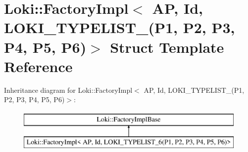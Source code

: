 \hypertarget{structLoki_1_1FactoryImpl_3_01AP_00_01Id_00_01LOKI__TYPELIST__6_07P1_00_01P2_00_01P3_00_01P4_00_01P5_00_01P6_08_4}{}\section{Loki\+:\+:Factory\+Impl$<$ A\+P, Id, L\+O\+K\+I\+\_\+\+T\+Y\+P\+E\+L\+I\+S\+T\+\_(P1, P2, P3, P4, P5, P6)$>$ Struct Template Reference}
\label{structLoki_1_1FactoryImpl_3_01AP_00_01Id_00_01LOKI__TYPELIST__6_07P1_00_01P2_00_01P3_00_01P4_00_01P5_00_01P6_08_4}
Inheritance diagram for Loki\+:\+:Factory\+Impl$<$ A\+P, Id, L\+O\+K\+I\+\_\+\+T\+Y\+P\+E\+L\+I\+S\+T\+\_(P1, P2, P3, P4, P5, P6)$>$\+:\begin{figure}[H]
\begin{center}
\leavevmode
\includegraphics[height=2.000000cm]{structLoki_1_1FactoryImpl_3_01AP_00_01Id_00_01LOKI__TYPELIST__6_07P1_00_01P2_00_01P3_00_01P4_00_01P5_00_01P6_08_4}
\end{center}
\end{figure}

